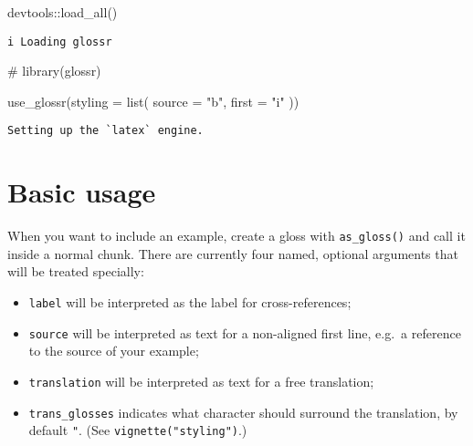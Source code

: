 \documentclass[
  letterpaper,
  DIV=11,
  numbers=noendperiod]{scrartcl}
\newenvironment{Shaded}{\begin{snugshade}}{\end{snugshade}}
\newcommand{\AttributeTok}[1]{\textcolor[rgb]{0.40,0.45,0.13}{#1}}
\newcommand{\CommentTok}[1]{\textcolor[rgb]{0.37,0.37,0.37}{#1}}
\newcommand{\FunctionTok}[1]{\textcolor[rgb]{0.28,0.35,0.67}{#1}}
\newcommand{\NormalTok}[1]{\textcolor[rgb]{0.00,0.23,0.31}{#1}}
\newcommand{\SpecialCharTok}[1]{\textcolor[rgb]{0.37,0.37,0.37}{#1}}
\newcommand{\StringTok}[1]{\textcolor[rgb]{0.13,0.47,0.30}{#1}}
\begin{document}
\begin{Shaded}
\begin{Highlighting}[]
\NormalTok{devtools}\SpecialCharTok{::}\FunctionTok{load\_all}\NormalTok{()}
\end{Highlighting}
\end{Shaded}

\begin{verbatim}
i Loading glossr
\end{verbatim}

\begin{Shaded}
\begin{Highlighting}[]
\CommentTok{\# library(glossr)}
\end{Highlighting}
\end{Shaded}

\begin{Shaded}
\begin{Highlighting}[]
\FunctionTok{use\_glossr}\NormalTok{(}\AttributeTok{styling =} \FunctionTok{list}\NormalTok{(}
  \AttributeTok{source =} \StringTok{"b"}\NormalTok{,}
  \AttributeTok{first =} \StringTok{"i"}
\NormalTok{))}
\end{Highlighting}
\end{Shaded}

\begin{verbatim}
Setting up the `latex` engine.
\end{verbatim}

\hypertarget{basic-usage}{%
\section{Basic usage}\label{basic-usage}}

When you want to include an example, create a gloss with
\texttt{as\_gloss()} and call it inside a normal chunk. There are
currently four named, optional arguments that will be treated specially:

\begin{itemize}
\item
  \texttt{label} will be interpreted as the label for cross-references;
\item
  \texttt{source} will be interpreted as text for a non-aligned first
  line, e.g.~a reference to the source of your example;
\item
  \texttt{translation} will be interpreted as text for a free
  translation;
\item
  \texttt{trans\_glosses} indicates what character should surround the
  translation, by default \texttt{"}. (See
  \texttt{vignette("styling")}.)
\end{itemize}
\end{document}
